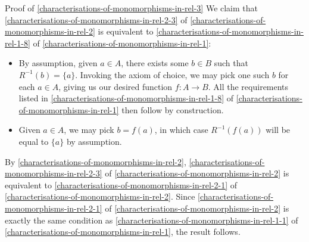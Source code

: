 \begin{Proof}{Proof of \cref{characterisations-of-monomorphisms-in-rel-3}}%
    We claim that \cref{characterisations-of-monomorphisms-in-rel-2-3} of \cref{characterisations-of-monomorphisms-in-rel-2} is equivalent to \cref{characterisations-of-monomorphisms-in-rel-1-8} of \cref{characterisations-of-monomorphisms-in-rel-1}:
    \begin{itemize}
        \item{}By assumption, given $a\in A$, there exists some $b\in B$ such that $R^{-1}(b)=\{a\}$. Invoking the axiom of choice, we may pick one such $b$ for each $a\in A$, giving us our desired function $f\colon A\to B$. All the requirements listed in \cref{characterisations-of-monomorphisms-in-rel-1-8} of \cref{characterisations-of-monomorphisms-in-rel-1} then follow by construction.
        \item{}Given $a\in A$, we may pick $b=f(a)$, in which case $R^{-1}(f(a))$ will be equal to $\{a\}$ by assumption.
    \end{itemize}
    By \cref{characterisations-of-monomorphisms-in-rel-2}, \cref{characterisations-of-monomorphisms-in-rel-2-3} of \cref{characterisations-of-monomorphisms-in-rel-2} is equivalent to \cref{characterisations-of-monomorphisms-in-rel-2-1} of \cref{characterisations-of-monomorphisms-in-rel-2}. Since \cref{characterisations-of-monomorphisms-in-rel-2-1} of \cref{characterisations-of-monomorphisms-in-rel-2} is exactly the same condition as \cref{characterisations-of-monomorphisms-in-rel-1-1} of \cref{characterisations-of-monomorphisms-in-rel-1}, the result follows.


\end{Proof}
